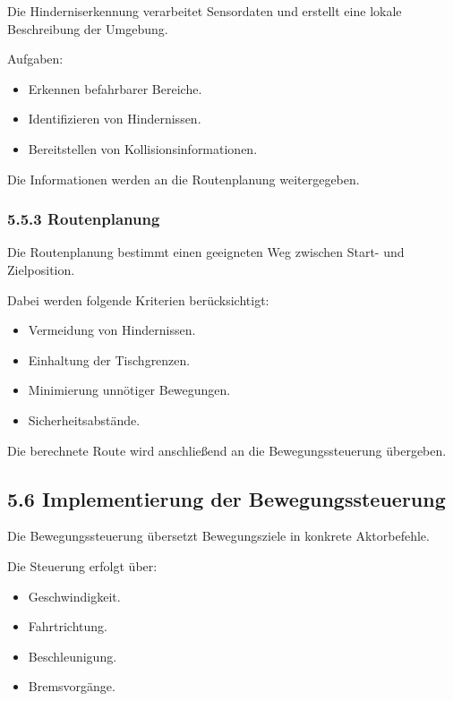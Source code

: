 \documentclass[
]{article}
\providecommand{\tightlist}{%
  \setlength{\itemsep}{0pt}\setlength{\parskip}{0pt}}
\begin{document}
Die Hinderniserkennung verarbeitet Sensordaten und erstellt eine lokale
Beschreibung der Umgebung.

Aufgaben:

\begin{itemize}
\tightlist
\item
  Erkennen befahrbarer Bereiche.
\item
  Identifizieren von Hindernissen.
\item
  Bereitstellen von Kollisionsinformationen.
\end{itemize}

Die Informationen werden an die Routenplanung weitergegeben.

\subsubsection{5.5.3 Routenplanung}\label{routenplanung}

Die Routenplanung bestimmt einen geeigneten Weg zwischen Start- und
Zielposition.

Dabei werden folgende Kriterien berücksichtigt:

\begin{itemize}
\tightlist
\item
  Vermeidung von Hindernissen.
\item
  Einhaltung der Tischgrenzen.
\item
  Minimierung unnötiger Bewegungen.
\item
  Sicherheitsabstände.
\end{itemize}

Die berechnete Route wird anschließend an die Bewegungssteuerung
übergeben.

\subsection{5.6 Implementierung der
Bewegungssteuerung}\label{implementierung-der-bewegungssteuerung}

Die Bewegungssteuerung übersetzt Bewegungsziele in konkrete
Aktorbefehle.

Die Steuerung erfolgt über:

\begin{itemize}
\tightlist
\item
  Geschwindigkeit.
\item
  Fahrtrichtung.
\item
  Beschleunigung.
\item
  Bremsvorgänge.
\end{itemize}
\end{document}
